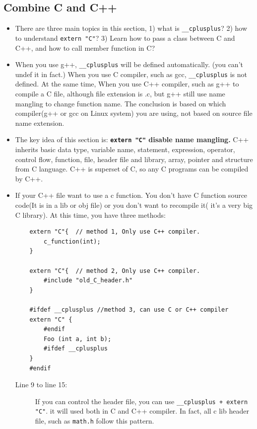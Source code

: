 \documentclass[a4paper,11pt,twoside]{book}
\begin{document}
\subsection{Combine C and C++}
\begin{itemize}
	
	\item There are three main topics in this section, 1) what is \texttt{\_\_cplusplus}? 2) how to understand \texttt{extern "C"}? 3) Learn how to pass a class between C and C++, and how to call member function in C? 
		
	\item When you use g++,  \texttt{\_\_cplusplus} will be defined automatically. (you can't undef it in fact.) When you use C compiler, such as gcc, \texttt{\_\_cplusplus} is not defined. At the same time, When you use C++ compiler, such as g++ to compile a C file, although file extension is .c, but g++ still use name mangling to change function name.  The conclusion is based on which compiler(g++ or gcc on Linux system) you are using, not based on source file name extension.
	
	
	\item The key idea of this section is: \textbf{\texttt{extern "C"} disable name mangling.} C++ inherits basic data type, variable name, statement, expression, operator, control flow, function, file, header file and library, array, pointer and structure from C language. C++ is superset of C, so any C programs can be compiled by C++.
	
		\item If your C++ file want to use a c function. You don't have C function source code(It is in a lib or obj file) or you don't want to recompile it( it's a very big C library). At this time, you have three methods:
	
\begin{lstlisting}
	extern "C"{  // method 1, Only use C++ compiler.
		c_function(int);
	}
	
	extern "C"{  // method 2, Only use C++ compiler.
		#include "old_C_header.h"
	}
	
	#ifdef __cplusplus //method 3, can use C or C++ compiler
	extern "C" {
		#endif
		Foo (int a, int b);
		#ifdef __cplusplus
	}
	#endif
\end{lstlisting}
	
	\begin{description}
		\item[Line 9 to line 15:] If you can control the header file, you can use \texttt{\_\_cplusplus + extern "C"}. it will used both in C and C++ compiler. In fact, all c lib header file, such as \texttt{math.h} follow this pattern.
	\end{description}


\end{itemize}
\end{document}
